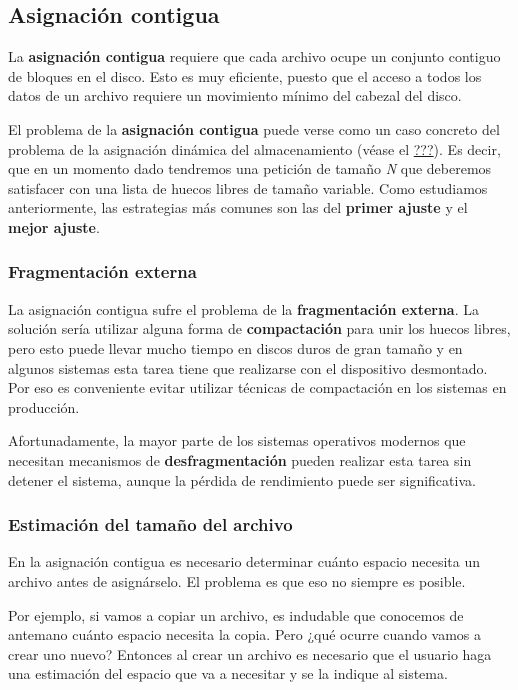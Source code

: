 \subsection{Asignación contigua}\label{_asignaciuxf3n_contigua}

{} La \textbf{asignación contigua} requiere que cada archivo ocupe un
conjunto contiguo de bloques en el disco. Esto es muy eficiente, puesto
que el acceso a todos los datos de un archivo requiere un movimiento
mínimo del cabezal del disco.

El problema de la \textbf{asignación contigua} puede verse como un caso
concreto del problema de la asignación dinámica del almacenamiento
(véase el \hyperref[_asignaciuxf3n_contigua_de_memoria]{???}). Es decir,
que en un momento dado tendremos una petición de tamaño \emph{N} que
deberemos satisfacer con una lista de huecos libres de tamaño variable.
Como estudiamos anteriormente, las estrategias más comunes son las del
\textbf{primer ajuste} y el \textbf{mejor ajuste}.

\subsubsection{Fragmentación externa}\label{_fragmentaciuxf3n_externa}

La asignación contigua sufre el problema de la \textbf{fragmentación
externa}. La solución sería utilizar alguna forma de
\textbf{compactación} para unir los huecos libres, pero esto puede
llevar mucho tiempo en discos duros de gran tamaño y en algunos sistemas
esta tarea tiene que realizarse con el dispositivo desmontado. Por eso
es conveniente evitar utilizar técnicas de compactación en los sistemas
en producción.

Afortunadamente, la mayor parte de los sistemas operativos modernos que
necesitan mecanismos de \textbf{desfragmentación} pueden realizar esta
tarea sin detener el sistema, aunque la pérdida de rendimiento puede ser
significativa.

\subsubsection{Estimación del tamaño del
archivo}\label{_estimaciuxf3n_del_tamauxf1o_del_archivo}

En la asignación contigua es necesario determinar cuánto espacio
necesita un archivo antes de asignárselo. El problema es que eso no
siempre es posible.

Por ejemplo, si vamos a copiar un archivo, es indudable que conocemos de
antemano cuánto espacio necesita la copia. Pero ¿qué ocurre cuando vamos
a crear uno nuevo? Entonces al crear un archivo es necesario que el
usuario haga una estimación del espacio que va a necesitar y se la
indique al sistema.

